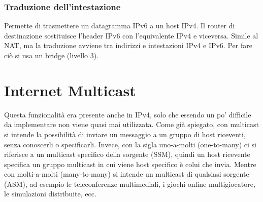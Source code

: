 \subsubsection{Traduzione dell’intestazione}
Permette di trasmettere un datagramma IPv6 a un host IPv4. Il router di destinazione sostituisce l’header IPv6 con l’equivalente IPv4 e viceversa. Simile al NAT, ma la traduzione avviene tra indirizzi e intestazioni IPv4 e IPv6. Per fare ciò si usa un bridge (livello 3).
\section{Internet Multicast}
Questa funzionalità era presente anche in IPv4, solo che essendo un po’ difficile da implementare non viene quasi mai utilizzata. Come già spiegato, con multicast si intende la possibilità di inviare un messaggio a un gruppo di host riceventi, senza conoscerli o specificarli. Invece, con la sigla uno-a-molti (one-to-many) ci si riferisce a un multicast specifico della sorgente (SSM), quindi un host ricevente specifica un gruppo multicast in cui viene host specifico è colui che invia. Mentre con molti-a-molti (many-to-many) si intende un multicast di qualsiasi sorgente (ASM), ad esempio le teleconferenze multimediali, i giochi online multigiocatore, le simulazioni distribuite, ecc.
